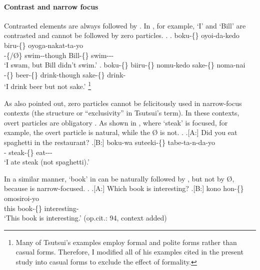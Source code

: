 \paragraph{Contrast and narrow focus}

Contrasted elements are always followed by  \cite[53ff.]{tsutsui84}.
In \Next[a], for example,
 `I' and  `Bill' are contrasted
and cannot be followed by zero particles.
%
\ex.
 \ag. boku-\{\} oyoi-da-kedo biru-\{\} oyoga-nakat-ta-yo \\
      -\{/{\O}\} swim--though Bill-\{\} swim--- \\
      `I swam, but Bill didn't swim.'
 \bg. boku-\{\} biiru-\{\} nomu-kedo sake-\{\} noma-nai \\
      -\{\} beer-\{\} drink-though sake-\{\} drink- \\
      `I drink beer but not sake.'
      \hfill{\cite[Modified from][]{tsutsui84}}%
      \footnote{
      Many of Tsutsui's examples employ formal and polite forms
      rather than casual forms.
      Therefore, I modified all of his examples cited
      in the present study into casual forms
      to exclude the effect of formality.
      }


As  also pointed out,
zero particles cannot be felicitously used
in narrow-focus contexts
(the  structure or ``exclusivity'' in Tsutsui's term).
In these contexts, overt particles are obligatory
\cite[see also][]{fujiiono00}.
As shown in \Next[B], where  `steak' is focused, for example,
the overt particle  is natural,
while the  {\O} is not.
%
\ex.
 \a.[A:] Did you eat spaghetti in the restaurant?
 \bg.[B:] boku-wa suteeki-\{\} tabe-ta-n-da-yo \\
          - steak-\{\} eat--- \\
          `I ate steak (not spaghetti).'
          \hfill{\cite[93, context added]{tsutsui84}}

In a similar manner,
 `book' in \Next[B] can be naturally followed by ,
but not by {\O},
because  is narrow-focused.
%
\ex.
 \a.[A:] Which book is interesting?
 \bg.[B:] kono hon-\{\} omosiroi-yo \\
          this book-\{\} interesting- \\
          `This book is interesting.'
          \hfill{(op.cit.: 94, context added)}

